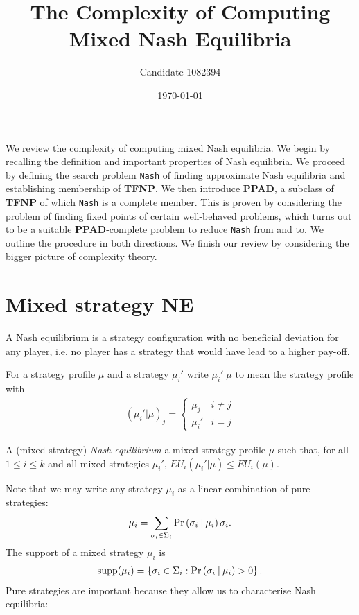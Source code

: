 \documentclass{article}
\begin{document}
\title{The Complexity of Computing Mixed Nash Equilibria}
\author{Candidate 1082394}
\date{\today}
\maketitle

We review the complexity of computing mixed Nash equilibria. We begin by
recalling the definition and important properties of Nash equilibria. We
proceed by defining the search problem \texttt{Nash} of finding approximate
Nash equilibria and establishing membership of \textbf{TFNP}. We then introduce
\textbf{PPAD}, a subclass of \textbf{TFNP} of which \texttt{Nash} is a complete
member. This is proven by considering the problem of finding fixed points of
certain well-behaved problems, which turns out to be a suitable
\textbf{PPAD}-complete problem to reduce \texttt{Nash} from and to. We outline
the procedure in both directions.
We finish our review by considering the bigger picture of complexity
theory.

\section{Mixed strategy NE}

A Nash equilibrium is a strategy configuration with no beneficial
deviation for any player, i.e. no player has a strategy that would have
lead to a higher pay-off.

For a strategy profile $\mu$ and a strategy $\mu_i'$ write
$\mu_i' | \mu$ to mean the strategy profile with
\begin{align*}
  (\mu_i' | \mu)_j = \begin{cases}
    \mu_j & i\neq j \\
    \mu_i' & i = j
  \end{cases}
\end{align*}

\begin{definition}
  A (mixed strategy) \emph{Nash equilibrium} a mixed strategy profile $\mu$
  such that, for all $1\leq i\leq k$ and all mixed strategies $\mu_i'$,
  $EU_i(\mu_i' | \mu) \leq EU_i(\mu)$.
\end{definition}

Note that we may write any strategy $\mu_i$ as a linear
combination of pure strategies:
\begin{align*}
  \mu_i = \sum_{\sigma_i\in\Sigma_i} \Pr\left({{\sigma_i}\:|\:\mu_i}\right) \sigma_i.
\end{align*}
The support of a mixed strategy $\mu_i$ is
\begin{align*}
  \operatorname*{supp}(\mu_i) = \left\lbrace{\sigma_i \in \Sigma_i : \Pr\left({{\sigma_i}\:|\:\mu_i}\right) > 0}\right\rbrace.
\end{align*}
Pure strategies are important because they allow us to characterise
Nash equilibria:
\end{document}
